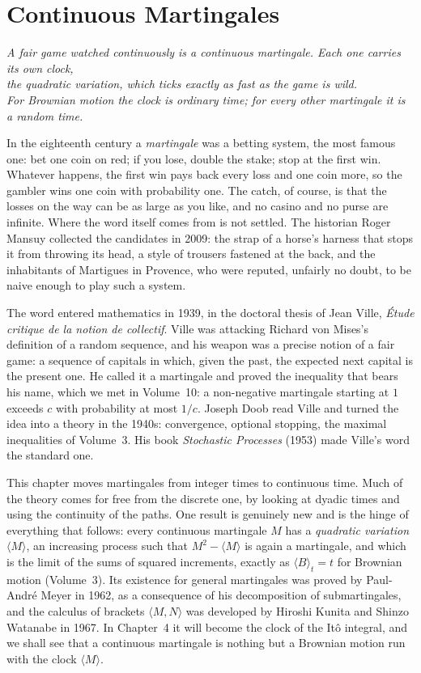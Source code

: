 \chapter{Continuous Martingales}

\begin{center}\itshape
A fair game watched continuously is a continuous martingale. Each one carries its own clock,\\
the quadratic variation, which ticks exactly as fast as the game is wild.\\
For Brownian motion the clock is ordinary time; for every other martingale it is a random time.
\end{center}

In the eighteenth century a \emph{martingale} was a betting system, the most famous one: bet one coin on red; if you lose, double the stake; stop at the first win. Whatever happens, the first
win pays back every loss and one coin more, so the gambler wins one coin with probability one. The catch, of course, is that the losses on the way can be as large as you like, and no
casino and no purse are infinite. Where the word itself comes from is not settled. The historian Roger Mansuy collected the candidates in 2009: the strap of a horse's harness that stops it
from throwing its head, a style of trousers fastened at the back, and the inhabitants of Martigues in Provence, who were reputed, unfairly no doubt, to be naive enough to play such a system.

The word entered mathematics in 1939, in the doctoral thesis of Jean Ville, \emph{\'Etude critique de la notion de collectif}. Ville was attacking Richard von Mises's definition of a random
sequence, and his weapon was a precise notion of a fair game: a sequence of capitals in which, given the past, the expected next capital is the present one. He called it a martingale and
proved the inequality that bears his name, which we met in Volume~10: a non-negative martingale starting at $1$ exceeds $c$ with probability at most $1/c$. Joseph Doob read Ville and
turned the idea into a theory in the 1940s: convergence, optional stopping, the maximal inequalities of Volume~3. His book \emph{Stochastic Processes} (1953) made Ville's word the standard one.

This chapter moves martingales from integer times to continuous time. Much of the theory comes for free from the discrete one, by looking at dyadic times and using the continuity of the
paths. One result is genuinely new and is the hinge of everything that follows: every continuous martingale $M$ has a \emph{quadratic variation} $\langle M\rangle$, an increasing process such
that $M^2-\langle M\rangle$ is again a martingale, and which is the limit of the sums of squared increments, exactly as $\langle B\rangle_t=t$ for Brownian motion (Volume~3). Its existence
for general martingales was proved by Paul-Andr\'e Meyer in 1962, as a consequence of his decomposition of submartingales, and the calculus of brackets $\langle M,N\rangle$ was developed by
Hiroshi Kunita and Shinzo Watanabe in 1967. In Chapter~4 it will become the clock of the It\^o integral, and we shall see that a continuous martingale is nothing but a Brownian motion run with
the clock $\langle M\rangle$.

